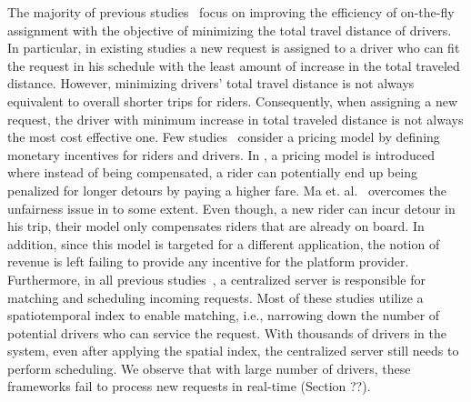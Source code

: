 The majority of previous studies~\cite{Ota15, Cici15, Cao15, PelzerITS15} focus on improving the efficiency of on-the-fly assignment with the objective of minimizing the total travel distance of drivers. In particular, in existing studies a new request is assigned to a driver who can fit the request in his schedule with the least amount of increase in the total traveled distance. However, minimizing drivers' total travel distance is not always equivalent to overall shorter trips for riders. Consequently, when assigning a new request, the driver with minimum increase in total traveled distance is not always the most cost effective one. Few studies~\cite{Ma13,Ma15} consider a pricing model by defining monetary incentives for riders and drivers. In \cite{Ma13}, a pricing model is introduced where instead of being compensated, a rider can potentially end up being penalized for longer detours by paying a higher fare. Ma et. al.~\cite{Ma15} overcomes the unfairness issue in \cite{Ma13} to some extent. Even though, a new rider can incur detour in his trip, their model only compensates riders that are already on board. In addition, since this model is targeted for a different application, the notion of revenue is left failing to provide any incentive for the platform provider. Furthermore, in all previous studies~\cite{Ma13,Huang14,Ma15}, a centralized server is responsible for matching and scheduling incoming requests. Most of these studies utilize a spatiotemporal index to enable matching, i.e., narrowing down the number of potential drivers who can service the request. With thousands of drivers in the system, even after applying the spatial index, the centralized server still needs to perform scheduling. We observe that with large number of drivers, these frameworks fail to process new requests in real-time (Section ??).




